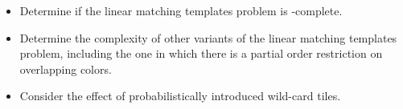 \begin{itemize}
\item Determine if the linear matching templates problem is \NP-complete.
\item Determine the complexity of other variants of the linear matching
  templates problem, including the one in which there is a partial order
  restriction on overlapping colors.
\item Consider the effect of probabilistically introduced wild-card tiles.
\end{itemize}

